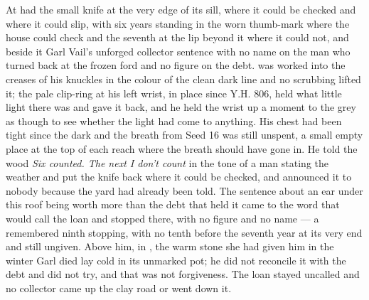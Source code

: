 At   had the small knife at the very edge of its sill, where it could be checked and where it could slip, with six years standing in the worn thumb-mark where the house could check and the seventh at the lip beyond it where it could not, and beside it Garl Vail's unforged collector sentence with no name on the man who turned back at the frozen ford and no figure on the debt.  was worked into the creases of his knuckles in the colour of the clean dark line and no scrubbing lifted it; the pale clip-ring at his left wrist, in place since Y.H. 806, held what little light there was and gave it back, and he held the wrist up a moment to the grey as though to see whether the light had come to anything. His chest had been tight since the dark and the breath from Seed 16 was still unspent, a small empty place at the top of each reach where the breath should have gone in. He told the wood \emph{Six counted. The next I don't count} in the tone of a man stating the weather and put the knife back where it could be checked, and announced it to nobody because the yard had already been told. The sentence about an ear under this roof being worth more than the debt that held it came to the word that would call the loan and stopped there, with no figure and no name --- a remembered ninth stopping, with no tenth before the seventh year at its very end and still ungiven. Above him, in , the warm stone she had given him in the winter Garl died lay cold in its unmarked pot; he did not reconcile it with the debt and did not try, and that was not forgiveness. The loan stayed uncalled and no collector came up the clay road or went down it.

\scenebreak

